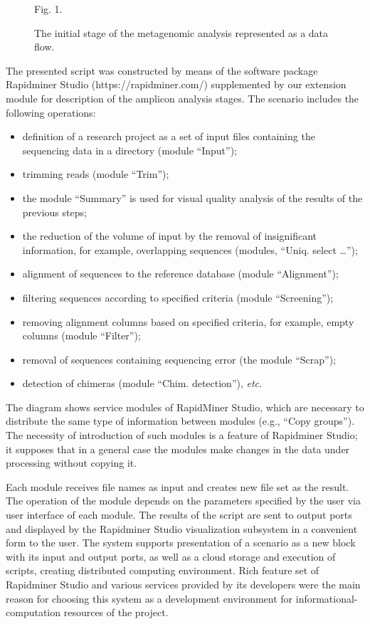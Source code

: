 \documentclass[conference,a4paper]{IEEEtran}
\begin{document}
\begin{figure}[t]\centering

Fig. 1.  \caption{The initial stage of the metagenomic analysis represented as a data flow.}
\end{figure}

The presented script was constructed by means of the software package Rapidminer Studio (https://rapidminer.com/) supplemented by our extension module for description of the amplicon analysis stages. The scenario includes the following operations:
\begin{itemize}
\item definition of a research project as a set of input files
  containing the sequencing data in a directory (module “Input”);
\item trimming reads (module “Trim”);
\item the module “Summary” is used for
  visual quality analysis of the results of the previous steps;
\item the
  reduction of the volume of input by the removal of insignificant
  information, for example, overlapping sequences (modules,
  “Uniq. select …”);
\item alignment of sequences to the reference
  database (module “Alignment”);
\item filtering sequences according to
  specified criteria (module “Screening”);
\item removing alignment
  columns based on specified criteria, for example, empty columns
  (module “Filter”);
\item removal of sequences containing sequencing
  error (the module “Scrap”);
\item detection of chimeras (module ``Chim. detection''), \emph{etc}.
  \end{itemize}
  The diagram shows service modules of RapidMiner Studio, which are necessary to distribute the same type of information between modules (e.g., “Copy groups”). The necessity of introduction of such modules is a feature of Rapidminer Studio; it supposes that in a general case the modules make changes in the data under processing without copying it.

Each module receives file names as input and creates new file set as the result. The operation of the module depends on the parameters specified by the user via user interface of each module. The results of the script are sent to output ports and displayed by the Rapidminer Studio visualization subsystem in a convenient form to the user. The system supports presentation of a scenario as a new block with its input and output ports, as well as a cloud storage and execution of scripts, creating distributed computing environment. Rich feature set of Rapidminer Studio and various services provided by its developers were the main reason for choosing this system as a development environment for informational-computation resources of the project.
\end{document}
